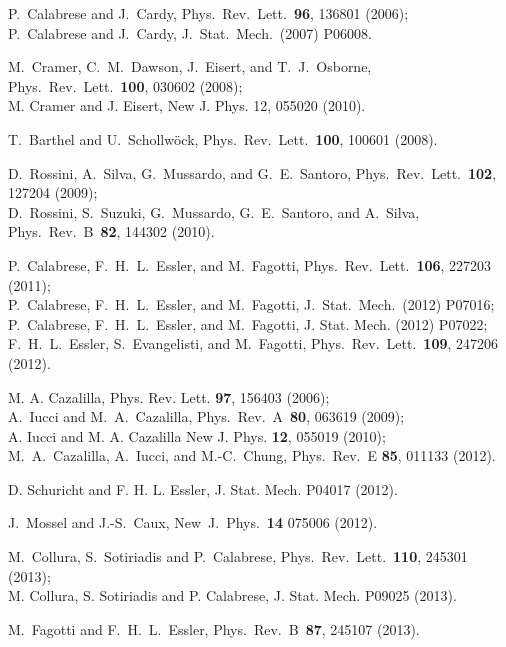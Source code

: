 \documentclass[11pt]{iopart}
\begin{document}
\begin{thebibliography}{99}
P.~Calabrese and J.~Cardy, Phys.\ Rev.\ Lett.\ {\bf 96}, 136801 (2006);\\
P.~Calabrese and J.~Cardy, J.\ Stat.\ Mech.\ (2007) P06008.


M.~Cramer, C.~M.~Dawson, J.~Eisert, and T.~J.~Osborne, Phys.\ Rev.\  Lett.\ {\bf 100}, 030602 (2008);\\
M. Cramer and J. Eisert, New J. Phys. 12, 055020 (2010).


T.~Barthel and U.~Schollw\"ock, Phys.\ Rev.\ Lett.\ {\bf 100}, 100601 (2008). 


D.~Rossini, A.~Silva, G.~Mussardo, and G.~E.~Santoro, Phys.\ Rev.\  Lett.\ {\bf 102}, 127204 (2009);\\
D.~Rossini, S.~Suzuki, G.~Mussardo, G.~E.~Santoro, and A.~Silva, Phys.\ Rev.\ B\ {\bf 82}, 144302 (2010).



P.~Calabrese, F.~H.~L.~Essler, and M.~Fagotti, Phys.\ Rev.\ Lett.\ {\bf106}, 227203 (2011);\\
P.~Calabrese, F.~H.~L.~Essler, and M.~Fagotti, J.\ Stat.\ Mech.\ (2012) P07016;\\
P.~Calabrese, F.~H.~L.~Essler, and M.~Fagotti, J. Stat. Mech. (2012) P07022;\\
F.~H.~L.~Essler, S.~Evangelisti, and M.~Fagotti, Phys.\ Rev.\ Lett.\  {\bf 109}, 247206 (2012). 


M. A. Cazalilla, Phys. Rev. Lett. {\bf 97}, 156403 (2006);\\
A.~Iucci and M.~A.~Cazalilla, Phys.\ Rev.\ A\ {\bf 80}, 063619 (2009);\\
A. Iucci and M. A. Cazalilla New J. Phys. {\bf 12}, 055019 (2010);\\
M.~A.~Cazalilla, A.~Iucci, and M.-C.~Chung, Phys.\ Rev.\ E {\bf 85},  011133 (2012). 


D. Schuricht and F. H. L. Essler, J. Stat. Mech. P04017 (2012).


J.~Mossel and J.-S.~Caux, New\ J.\ Phys.\ {\bf 14} 075006 (2012).


M.~Collura, S.~Sotiriadis and P.~Calabrese, Phys.\ Rev.\ Lett.\ {\bf 110}, 245301 (2013);\\
M. Collura, S. Sotiriadis and P. Calabrese, J. Stat. Mech. P09025 (2013).


M.~Fagotti and F.~H.~L.~Essler, Phys.\ Rev.\ B\ {\bf87}, 245107 (2013).



\end{thebibliography}
\end{document}
